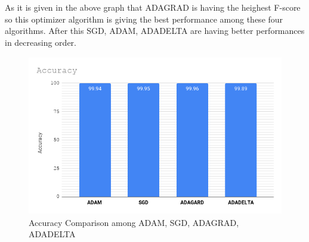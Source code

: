 \documentclass{report}
\begin{document}
As it is given in the above graph that ADAGRAD is having the heighest F-score so this optimizer algorithm is giving the best performance among these four algorithms. After this SGD, ADAM, ADADELTA are having better performances in decreasing order. 

\begin{figure}[htbp]
\label{fig:accuracy}
\centering
\includegraphics[height=7cm]{Pictures/Accuracy_chart.png}
\caption{Accuracy Comparison among ADAM, SGD, ADAGRAD, ADADELTA}
\end{figure}
\end{document}
